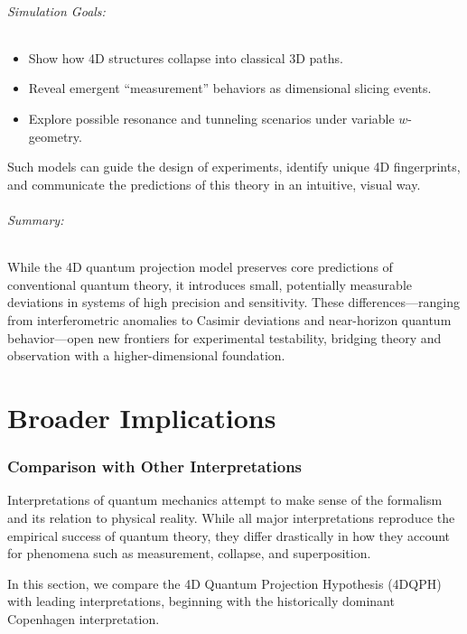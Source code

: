 \documentclass[12pt]{article}
\begin{document}
\paragraph{Simulation Goals:}
\begin{itemize}
    \item Show how 4D structures collapse into classical 3D paths.
    \item Reveal emergent “measurement” behaviors as dimensional slicing events.
    \item Explore possible resonance and tunneling scenarios under variable \( w \)-geometry.
\end{itemize}

Such models can guide the design of experiments, identify unique 4D fingerprints, and communicate the predictions of this theory in an intuitive, visual way.

\paragraph{Summary:} While the 4D quantum projection model preserves core predictions of conventional quantum theory, it introduces small, potentially measurable deviations in systems of high precision and sensitivity. These differences—ranging from interferometric anomalies to Casimir deviations and near-horizon quantum behavior—open new frontiers for experimental testability, bridging theory and observation with a higher-dimensional foundation.

\newpage

\part{Broader Implications}

\section{Comparison with Other Interpretations}

Interpretations of quantum mechanics attempt to make sense of the formalism and its relation to physical reality. While all major interpretations reproduce the empirical success of quantum theory, they differ drastically in how they account for phenomena such as measurement, collapse, and superposition.

In this section, we compare the 4D Quantum Projection Hypothesis (4DQPH) with leading interpretations, beginning with the historically dominant Copenhagen interpretation.
\end{document}
